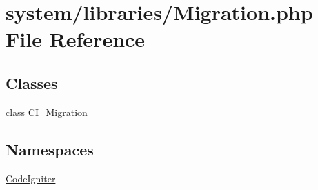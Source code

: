 \hypertarget{_migration_8php}{}\section{system/libraries/\+Migration.php File Reference}
\label{_migration_8php}
\subsection*{Classes}
\begin{DoxyCompactItemize}
\item 
class \mbox{\hyperlink{class_c_i___migration}{C\+I\+\_\+\+Migration}}
\end{DoxyCompactItemize}
\subsection*{Namespaces}
\begin{DoxyCompactItemize}
\item 
 \mbox{\hyperlink{namespace_code_igniter}{Code\+Igniter}}
\end{DoxyCompactItemize}
